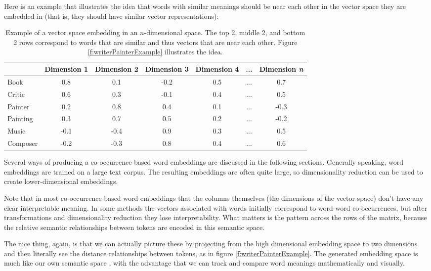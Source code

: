 Here is an example that illustrates the idea that words with similar meanings should be near each other in the vector space they are embedded in (that is, they should have similar vector representations):
\begin{table}[h]
    \centering
    \begin{tabular}{|l|c|c|c|c|c|c|}
    \hline
     & Dimension 1 & Dimension 2 & Dimension 3 & Dimension 4 & ... & Dimension \textit{n} \\
    \hline
    Book    & 0.8 & 0.1 & -0.2 & 0.5 & ... & 0.7  \\
    \hline
    Critic  & 0.6 & 0.3 & -0.1 & 0.4 & ... & 0.5  \\
    \hline
    Painter & 0.2 & 0.8 & 0.4 & 0.1 & ... & -0.3 \\
    \hline
    Painting& 0.3 & 0.7 & 0.5 & 0.2 & ... & -0.2  \\
    \hline
    Music   & -0.1 & -0.4 & 0.9 & 0.3 & ... & 0.5  \\
    \hline
    Composer& -0.2 & -0.3 & 0.8 & 0.4 & ... & 0.6 \\
    \hline
    \end{tabular}
    \caption{Example of a vector space embedding in an $n$-dimensional space. The top 2, middle 2, and bottom 2 rows correspond to words that are similar and thus vectors that are near each other.  Figure \ref{f:writerPainterExample} illustrates the idea.}
    \label{exampleEmbeddings}
\end{table}

Several ways of producing a co-occurrence based word embeddings are discussed in the following sections. Generally speaking, word embeddings are trained on a large text corpus. The resulting embeddings are often quite large, so dimensionality reduction can be used to create lower-dimensional embeddings. 

Note that in most co-occurrence-based word embeddings that the columns themselves (the dimensions of the vector space) don't have any clear interpretable meaning. In some methods the vectors associated with words initially correspond to word-word co-occurrences, but after transformations and dimensionality reduction they lose interpretability. What matters is the pattern across the rows of the matrix, because the relative semantic relationships between tokens are encoded in this semantic space. 

The nice thing, again, is that we can actually picture these by projecting from the high dimensional embedding space to two dimensions and then literally see the distance relationships between tokens, as in figure \ref{f:writerPainterExample}. The generated embedding space is much like our own semantic space \cite{lewis2019distributional}, with the advantage that we can track and compare word meanings mathematically and visually.


